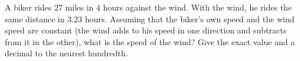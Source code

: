 A biker rides $27$ miles in $4$ hours against the wind. With the wind, he rides the same distance in $3.23$ hours. Assuming that the biker's own speed and the wind speed are constant (the wind adds to his speed in one direction and subtracts from it in the other), what is the speed of the wind? Give the exact value and a decimal to the nearest hundredth.
